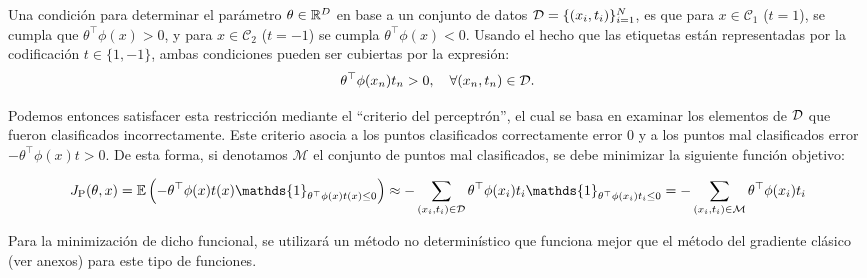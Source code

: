 Una condición para determinar el parámetro $\theta\in\mathbb{R}^D$ en base a un conjunto de datos  ${\mathcal D} = \{(x_i,t_i)\}_{i=1}^N$, es que para $x\in\mathcal{C}_1$ ($t=1$), se cumpla que $\theta^\top\phi(x) > 0$, y para $x\in\mathcal{C}_2$ ($t=-1$) se cumpla $\theta^\top \phi(x) < 0$. Usando el hecho que las etiquetas están representadas por la  codificación $t\in\{1,-1\}$, ambas condiciones pueden ser cubiertas por la expresión:
\begin{equation}
	\theta^\top\phi(x_n)t_n > 0,\quad \forall (x_n,t_n) \in {\mathcal D}.
\end{equation}

Podemos entonces satisfacer esta restricción mediante el ``criterio del perceptrón'', el cual se basa en examinar  los elementos de ${\mathcal D}$ que fueron clasificados incorrectamente. Este criterio asocia a los puntos clasificados correctamente error 0 y a los puntos mal clasificados error $-\theta^\top\phi(x)t>0$. De esta forma, si denotamos $\mathcal{M}$ el conjunto de puntos mal clasificados, se debe minimizar la siguiente función objetivo:


\begin{equation}
	J_\text{P}(\theta,x) = \E\left(-\theta^\top\phi(x)t(x)\mathds{1}_{\theta^\top\phi(x)t(x)\leq 0} \right) \approx -\sum_{(x_i,t_i)\in \mathcal{D}}\theta^\top\phi(x_i)t_i \mathds{1}_{\theta^\top\phi(x_i)t_i\leq 0} = -\sum_{(x_i,t_i)\in \mathcal{M}}\theta^\top\phi(x_i)t_i
\end{equation}

Para la minimización de dicho funcional, se utilizará un método no determinístico que funciona mejor que el método del gradiente clásico (ver anexos) para este tipo de funciones.


